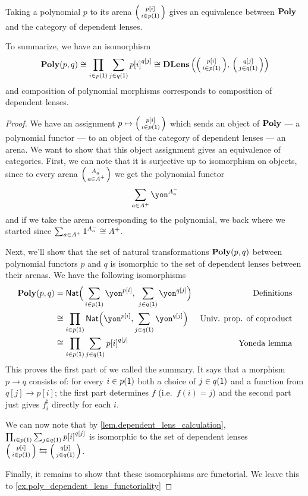 \documentclass[DynamicalBook]{subfiles}
\begin{document}
\begin{proposition}\label{prop.poly_maps_colax_prod_sum}
Taking a polynomial $p$ to its arena $\lens{p[i]}{i \in p(\1)}$ gives
an equivalence between $\textbf{Poly}$ and the category of dependent lenses.

To summarize, we have an isomorphism
\begin{equation}\label{eqn.main_formula}
\poly(p,q)\cong\prod_{i\in p(\1)}\sum_{j\in q(\1)}{p[i]}^{q[j]} \cong \Cat{DLens}\left( \lens{p[i]}{i \in p(\1)},\, \lens{q[j]}{j \in q(\1)}\right)
\end{equation}
and composition of polynomial morphisms corresponds to composition of dependent lenses.
\end{proposition}
\begin{proof}
We have an assignment $p \mapsto \lens{p[i]}{i \in p(\1)}$ which sends an object
of $\textbf{Poly}$ --- a polynomial functor --- to an object of the category of
dependent lenses --- an arena. We want to show that this object assignment gives
an equivalence of categories. First, we can note that it is surjective up to isomorphism on
objects, since to every arena $\lens{A^-_{a}}{a \in A^+}$ we get the polynomial
functor
\[\sum_{a \in A^+} \yon^{A^-_{a}}\]
and if we take the arena corresponding to the polynomial, we back where we
started since $\sum_{a \in A^+} \textsf{1}^{A^-_{a}} \cong A^+$.
 
Next, we'll show that the set of natural transformations $\textbf{Poly}(p,q)$ between polynomial functors $p$
and $q$ is isomorphic to the set of dependent lenses between their arenas. We have the following isomorphisms
\begin{align*}
  \poly(p,q)&=
  \nat\Big(\sum_{i\in p(\1)}\yon^{p[i]},\;\sum_{j\in q(\1)}\yon^{q[j]}\Big)&
  	\text{Definitions}\\&\cong
  \prod_{i\in p(\1)}\nat\Big(\yon^{p[i]},\sum_{j\in q(\1)}\yon^{q[j]}\Big)&
  	\text{Univ. prop. of coproduct}\\&\cong
  \prod_{i\in p(\1)}\sum_{j\in q(\1)}{p[i]}^{q[j]}&
  	\text{Yoneda lemma}
\end{align*}
This proves the first part of we called the summary. It says that a morphism
$p\to q$ consists of: for every $i\in p(\textsf{1})$ both a choice of $j\in q(\textsf{1})$ and a
function from $q[j]\to p[i]$; the first part determines $f$ (i.e.\ $f(i)=j$) and
the second part just gives $f^\sharp_i$ directly for each $i$.

We can now note that by \cref{lem.dependent_lens_calculation}, $\prod_{i\in
  p(\textsf{1})}\sum_{j\in q(\textsf{1})}{p[i]}^{q[j]}$ is isomorphic to the set of dependent
lenses $\lens{p[i]}{i \in p(\1)} \fromto \lens{q[j]}{j \in q(\1)}$.

Finally, it remains to show that these isomorphisms are functorial. We leave
this to \cref{ex.poly_dependent_lens_functoriality}
\end{proof}
\end{document}
